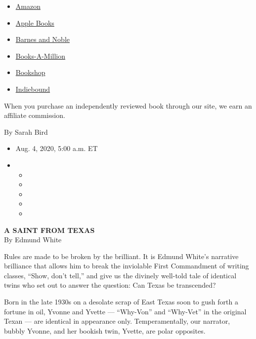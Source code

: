 \begin{itemize}
\tightlist
\item
  \href{https://www.amazon.com/gp/search?index=books\&tag=NYTBSREV-20\&field-keywords=A+Saint+From+Texas+Edmund+White}{Amazon}
\item
  \href{https://du-gae-books-dot-nyt-du-prd.appspot.com/buy?title=A+Saint+From+Texas\&author=Edmund+White}{Apple
  Books}
\item
  \href{https://www.anrdoezrs.net/click-7990613-11819508?url=https\%3A\%2F\%2Fwww.barnesandnoble.com\%2Fw\%2F\%3Fean\%3D9781635572551}{Barnes
  and Noble}
\item
  \href{https://www.anrdoezrs.net/click-7990613-35140?url=https\%3A\%2F\%2Fwww.booksamillion.com\%2Fp\%2FA\%2BSaint\%2BFrom\%2BTexas\%2FEdmund\%2BWhite\%2F9781635572551}{Books-A-Million}
\item
  \href{https://bookshop.org/a/3546/9781635572551}{Bookshop}
\item
  \href{https://www.indiebound.org/book/9781635572551?aff=NYT}{Indiebound}
\end{itemize}

When you purchase an independently reviewed book through our site, we
earn an affiliate commission.

By Sarah Bird

\begin{itemize}
\item
  Aug. 4, 2020, 5:00 a.m. ET
\item
  \begin{itemize}
  \item
  \item
  \item
  \item
  \item
  \end{itemize}
\end{itemize}

\textbf{A SAINT FROM TEXAS}\\
By Edmund White

Rules are made to be broken by the brilliant. It is Edmund White's
narrative brilliance that allows him to break the inviolable First
Commandment of writing classes, ``Show, don't tell,'' and give us the
divinely well-told tale of identical twins who set out to answer the
question: Can Texas be transcended?

Born in the late 1930s on a desolate scrap of East Texas soon to gush
forth a fortune in oil, Yvonne and Yvette --- ``Why-Von'' and
``Why-Vet'' in the original Texan --- are identical in appearance only.
Temperamentally, our narrator, bubbly Yvonne, and her bookish twin,
Yvette, are polar opposites.

